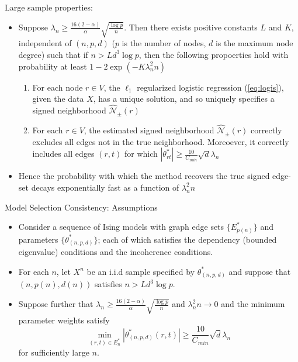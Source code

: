 \documentclass[xcolor=dvipsnames,aspectratio=1610]{beamer}
\newcommand{\abs}[1]{\left|#1\right|}
\theoremstyle{remark}
\begin{document}
\begin{frame}{Large sample properties:}
  \begin{itemize}
    \setlength{\itemsep}{10pt}
\item Suppose $\lambda_n \geq \frac{16(2-\alpha)}{\alpha} \sqrt{\frac{\log p}{n}}$. Then there exists positive constants $L$ and $K$, independent of $(n,p,d)$ ($p$ is the number of nodes, $d$ is the maximum node degree) such that if $n > Ld^3 \log p$, then the following propoerties hold with probability at least $1-2\exp(-K\lambda_n^2n)$
\begin{enumerate}
\item For each node $r \in V$, the $\ell_1$ regularized logistic regression (\ref{eq:logis}), given the data $X$, has a unique solution, and so uniquely specifies a signed neighborhood $\hat{\mathcal{N}}_{\pm}(r)$
\item For each $r \in V$, the estimated signed neighborhood $\hat{\mathcal{N}}_{\pm}(r)$ correctly excludes all edges not in the true neighborhood. Moreoever, it correctly includes all edges $(r,t)$ for which $\abs{\theta_{rt}^*} \geq \frac{10}{C_{min}} \sqrt{d} \lambda_n$
\end{enumerate}
\item Hence the probability with which the method recovers the true signed edge-set decays exponentially fast as a function of $\lambda_n^2n$
  \end{itemize}
\end{frame}

\begin{frame}{Model Selection Consistency: Assumptions}
  \begin{itemize}
    \setlength{\itemsep}{10pt}
\item Consider a sequence of Ising models with graph edge sets $\{E^*_{p(n)}\}$ and parameters $\{\theta^*_{(n,p,d)}\}$; each of which satisfies the dependency (bounded eigenvalue) conditions and the incoherence conditions. 
\item For each $n$, let $X^n$ be an i.i.d sample specified by $\theta^*_{(n,p,d)}$ and suppose that $(n,p(n),d(n))$ satisfies $n > Ld^3 \log p$. 
\item Suppose further that $\lambda_n \geq \frac{16(2-\alpha)}{\alpha} \sqrt{\frac{\log p}{n}}$ and $\lambda_n^2 n \to 0$ and the minimum parameter weights satisfy 
$$
\min_{(r,t) \in E^*_n} \abs{\theta^*_{(n,p,d)}(r,t)} \geq \frac{10}{C_{min}} \sqrt{d} \lambda_n
$$ 
for sufficiently large $n$. 
  \end{itemize}
\end{frame}
\end{document}
